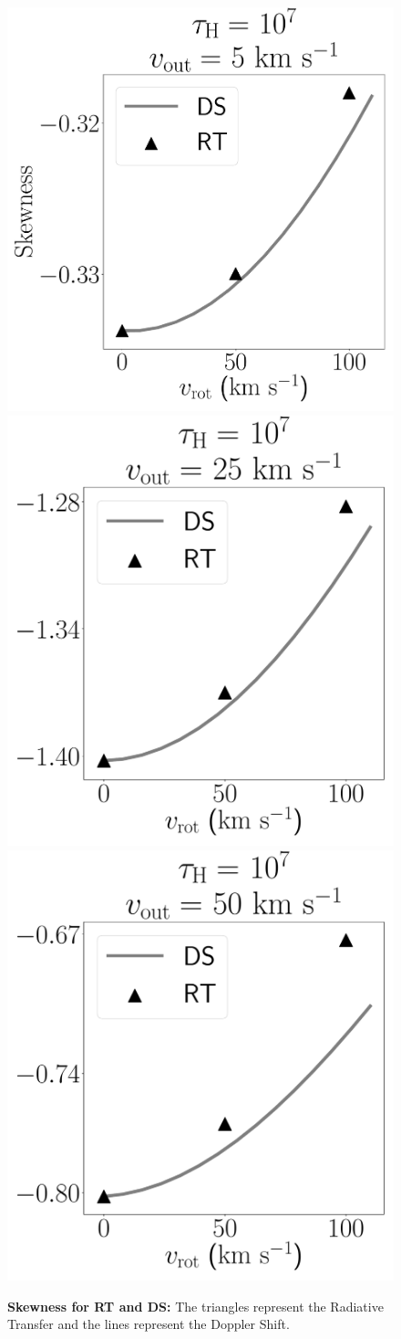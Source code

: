 \documentclass[a4paper,fleqn,usenatbib]{mnras}
\begin{document}
\begin{figure}
\begin{center}
\includegraphics[height=0.27\textwidth]{./figures/results/line_characterization_skw_vout5_logtau7}
\includegraphics[height=0.27\textwidth]{./figures/results/line_characterization_skw_vout25_logtau7}
\includegraphics[height=0.27\textwidth]{./figures/results/line_characterization_skw_vout50_logtau7}
\end{center}
\caption{\textbf{Skewness for RT and DS:} The triangles represent the Radiative
    Transfer and the lines represent the Doppler Shift.
    \label{fig:skewness}}
\end{figure}
\end{document}

